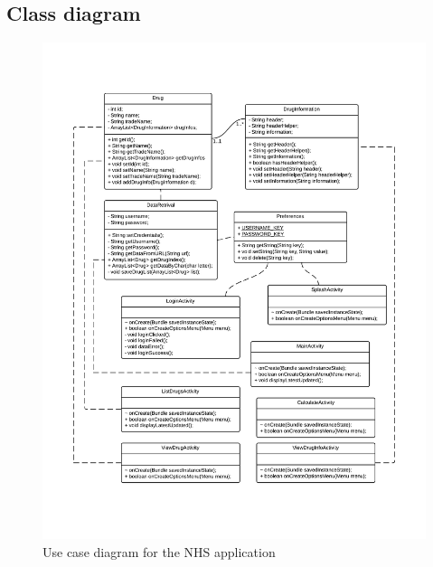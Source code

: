 \documentclass[11pt,fleqn,twoside]{article}
\begin{document}
\subsection{Class diagram}
\begin{figure}[H]
\centering
\includegraphics[width=6.5in]{classDiagram}
\caption{Use case diagram for the NHS application}
\end{figure}

\end{document}
